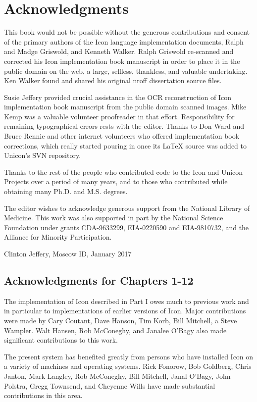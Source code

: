\section*{Acknowledgments}

This book would not be possible without the generous contributions and
consent of the primary authors of the Icon language implementation
documents, Ralph and Madge Griswold, and Kenneth Walker. Ralph
Griswold re-scanned and corrected his Icon implementation book
manuscript in order to place it in the public domain on the web, a
large, selfless, thankless, and valuable undertaking. Ken Walker found
and shared his original nroff dissertation source files.

Susie Jeffery provided crucial assistance in the OCR reconstruction of
Icon implementation book manuscript from the public domain scanned
images. Mike Kemp was a valuable volunteer proofreader in that
effort. Responsibility for remaining typographical errors rests with
the editor. Thanks to Don Ward and Bruce Rennie and other internet
volunteers who offered implementation book corrections, which really
started pouring in once its LaTeX source was added to Unicon's SVN
repository.

Thanks to the rest of the people who contributed code to the Icon and
Unicon Projects over a period of many years, and to those who
contributed while obtaining many Ph.D. and M.S. degrees.

The editor wishes to acknowledge generous support from the National
Library of Medicine. This work was also supported in part by the
National Science Foundation under grants CDA-9633299, EIA-0220590
and EIA-9810732, and the Alliance for Minority Participation.

Clinton Jeffery, Moscow ID, January 2017

\subsection*{Acknowledgments for Chapters 1-12}

The implementation of Icon described in Part I owes much to previous
work and in particular to implementations of earlier versions of
Icon. Major contributions were made by Cary Coutant, Dave Hanson, Tim
Korb, Bill Mitchell, a Steve Wampler. Walt Hansen, Rob McConeghy, and
Janalee O'Bagy also made significant contributions to this work.

The present system has benefited greatly from persons who have
installed Icon on a variety of machines and operating systems. Rick
Fonorow, Bob Goldberg, Chris Janton, Mark Langley, Rob McConeghy, Bill
Mitchell, Janal O'Bagy, John Polstra, Gregg Townsend, and Cheyenne
Wills have made substantial contributions in this area.


